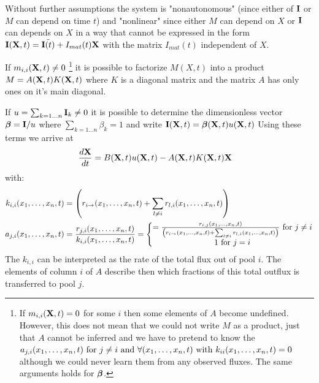 %

Without further assumptions the system is "nonautonomous" (since either of $\mathbf{I}$ or $M$ can depend on time $t$) 
and "nonlinear" since either $M$ can depend on $X$ or $\mathbf{I}$ can depends on $X$ in a way that cannot be expressed in the form $\mathbf{I}(\mathbf{X},t)=\tilde{\mathbf{I}(t)}+I_{mat}(t)\mathbf{X}$ with the matrix $I_{mat}(t)$ independent of $X$.

If $m_{i,i}(\mathbf{X},t) \ne 0$ 
\footnote{
  If $m_{i,i}(\mathbf{X},t) = 0 $ for some $i$ then some elements of $A$ become
  undefined. However, this does not mean that we could not write $M$ as a
  product, just that $A$ cannot be inferred and we have to pretend to know the
  $a_{j,i}(x_1, \dots, x_n, t) \text{ for } j\ne i \text{ and } \forall (x_1, \dots, x_n, t) \text{ with }
  k_{ii}(x_1, \dots, x_n, t)=0 $ although we could never learn them from any observed fluxes.
  The same arguments holds for $\bm{\beta}$.
}
it is possible to factorize $M(X,t)$ into a product $M=A(\mathbf{X},t) K(\mathbf{X},t)$ where $K$ is
a diagonal matrix and the matrix $A$ has only ones on it's main diagonal. 

If $u=\sum_{k=1\dots n} \mathbf{I}_k \ne 0$ it is possible to determine the dimensionless vector $\bm{\beta} = \mathbf{I}/u$ where $\sum_{k=1\dots n} \beta_k =1$ and write $\mathbf{I}(\mathbf{X},t)=\bm{\beta}(\mathbf{X},t)u(\mathbf{X},t)$ 
Using these terms  we arrive at 
\begin{align*}
\frac{d \mathbf{X}}{d t}&=B(\mathbf{X},t) u(\mathbf{X},t) - A(\mathbf{X},t) K(\mathbf{X},t) \mathbf{X}   
\end{align*}
\newcommand{\kiixt}{
      \left(
      r_{i \rightarrow } \xnt
      + 
      \sum_{l \ne i} r_{l,i} \xnt
      \right)
}
with:
\begin{align}
  k_{i,i}\xnt &=\kiixt \nonumber
  \\
  a_{j,i}\xnt
  &=\frac{r_{j,i}\xnt}{k_{i,i}\xnt}=
  \left\{
  \begin{matrix}
    =\frac{
    r_{i,j}\xnt 
  }{
    \kiixt
  } \text{ for } j \ne i
  \\
  1 \text{ for } j=i
  \end{matrix}
  \right.
  \label{aij}
\end{align}
The $k_{i,i}$ can be interpreted as the rate of the total flux out of pool $i$. The elements of column $i$ of $A$ describe then which fractions of this total outflux is transferred to pool $j$. 

